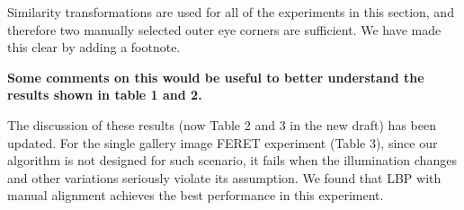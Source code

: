 \documentclass[11pt]{article}
\begin{document}
Similarity transformations are used for all of the experiments in this section, and
therefore two manually selected outer eye corners are sufficient.  We have
made this clear by adding a footnote.

{\bf
	Some comments on this would be useful to better understand the results shown in table 1 and 2.
}

The discussion of these results (now Table 2 and 3 in the new
draft) has been updated. For the single gallery image FERET
experiment (Table 3), since our algorithm is not designed for
such scenario, it fails when the illumination changes and other
variations seriously violate its assumption. We found that LBP
with manual alignment achieves the best performance in this
experiment.
\end{document}

